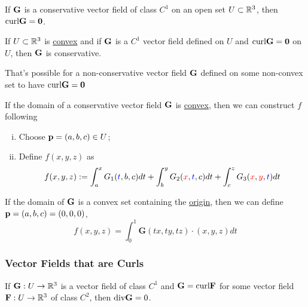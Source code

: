 \documentclass[11pt]{article}
\newcommand{\veF}[0]{\ve{F}}
\newcommand{\veG}[0]{\ve{G}}
\begin{document}
			\begin{theorem}
				If $\veG$ is a conservative vector field of class $C^1$ on an open set $U \subset \mathbb{R}^3$, then $\curl \veG = \ve{0}$.
			\end{theorem}
			
			\begin{theorem}
				If $U \subset \mathbb{R}^3$ is \ul{convex} and if $\veG$ is a $C^1$ vector field defined on $U$ and $\curl \veG = \ve{0}$ on $U$, then $\veG$ is conservative.
			\end{theorem}
			
			\begin{remark}
				That's possible for a non-conservative vector field $\veG$ defined on some non-convex set to have $\curl \veG = \ve{0}$
			\end{remark}
				
			\begin{proposition}
				If the domain of a conservative vector field $\veG$ is \ul{convex}, then we can construct $f$ following
				\begin{enumerate}[(i)]
					\item Choose $\textbf{p} = (a, b, c) \in U$;
					\item Define $f(x, y, z)$ as
					\begin{equation}
						f(x, y, z) :=\int_{a}^{x} G_{1}(\textcolor{blue}{t}, b, c) d t+\int_{b}^{y} G_{2}(\textcolor{red}{x}, \textcolor{blue}{t}, c) d t+\int_{c}^{z} G_{3}(\textcolor{red}{x}, \textcolor{red}{y}, \textcolor{blue}{t}) d t
					\end{equation}
				\end{enumerate}
			\end{proposition}
			
			\begin{corollary}
				If the domain of $\veG$ is a convex set containing the \ul{origin}, then we can define $\textbf{p} = (a, b, c) = (0, 0, 0)$,
				\begin{equation}
					f(x, y, z)=\int_{0}^{1} \mathbf{G}(t x, t y, t z) \cdot (x, y, z) d t
				\end{equation}
			\end{corollary}
			
		\subsubsection{Vector Fields that are Curls}
			\begin{theorem}
				If $\veG: U \to \R^3$ is a vector field of class $C^1$ and $\veG = \curl \veF$ for some vector field $\veF: U \to \R^3$ of class $C^2$, then $\dive \veG = 0$.
			\end{theorem}
			
\end{document}
